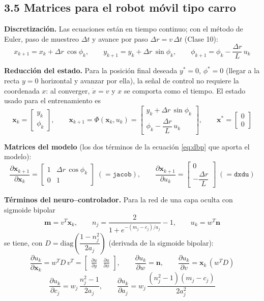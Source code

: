 \documentclass[11pt,a4paper]{article}
\newcommand{\pd}[2]{\frac{\partial #1}{\partial #2}}
\begin{document}
\subsection*{3.5 Matrices para el robot móvil tipo carro}

\textbf{Discretización.} Las ecuaciones están en tiempo continuo; con el método de Euler, paso de muestreo $\Delta t$ y avance por paso $\Delta r=v\,\Delta t$ (Clase 10):
\[
x_{k+1}=x_k+\Delta r\,\cos\phi_k,\qquad
y_{k+1}=y_k+\Delta r\,\sin\phi_k,\qquad
\phi_{k+1}=\phi_k-\frac{\Delta r}{L}\,u_k
\]

\textbf{Reducción del estado.} Para la posición final deseada $y^{*}=0$, $\phi^{*}=0$ (llegar a la recta $y=0$ horizontal y avanzar por ella), la señal de control no requiere la coordenada $x$: al converger, $\dot x=v$ y $x$ se comporta como el tiempo. El estado usado para el entrenamiento es
\[
\mathbf x_k=\begin{bmatrix}y_k\\ \phi_k\end{bmatrix},\qquad
\mathbf x_{k+1}=\Phi(\mathbf x_k,u_k)=
\begin{bmatrix} y_k+\Delta r\,\sin\phi_k\\[2pt] \phi_k-\dfrac{\Delta r}{L}\,u_k \end{bmatrix},
\qquad \mathbf x^{*}=\begin{bmatrix}0\\0\end{bmatrix}
\]

\textbf{Matrices del modelo} (los dos términos de la ecuación \eqref{eq:dbp} que aporta el modelo):
\begin{equation}
\pd{\mathbf x_{k+1}}{\mathbf x_k}=
\begin{bmatrix}
1 & \Delta r\,\cos\phi_k\\
0 & 1
\end{bmatrix}
\;(=\texttt{jacob}),
\qquad
\pd{\mathbf x_{k+1}}{u_k}=
\begin{bmatrix} 0\\ -\dfrac{\Delta r}{L}\end{bmatrix}
\;(=\texttt{dxdu})
\label{eq:matmodelo}
\end{equation}

\textbf{Términos del neuro--controlador.} Para la red de una capa oculta con sigmoide bipolar
\[
\mathbf m=v^{T}\mathbf x_k,\qquad
n_j=\frac{2}{1+e^{-(m_j-c_j)/a_j}}-1,\qquad
u_k=w^{T}\mathbf n
\]
se tiene, con $D=\mathrm{diag}\!\left(\dfrac{1-n_j^{2}}{2a_j}\right)$ (derivada de la sigmoide bipolar):
\[
\pd{u_k}{\mathbf x_k}=w^{T}D\,v^{T}
=\begin{bmatrix}\pd{u}{y} & \pd{u}{\phi}\end{bmatrix},
\qquad
\pd{u_k}{w}=\mathbf n,\qquad
\pd{u_k}{v}=\mathbf x_k\,(w^{T} D)
\]
\[
\pd{u_k}{c_j}=w_j\,\frac{n_j^{2}-1}{2a_j},
\qquad
\pd{u_k}{a_j}=w_j\,\frac{(n_j^{2}-1)(m_j-c_j)}{2a_j^{2}}
\]
\end{document}
